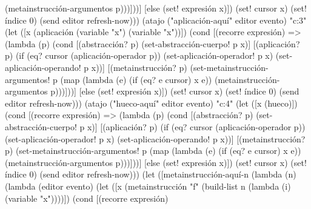 \documentclass[10pt,oneside,openany,letterpaper]{book}
\begin{document}
                                        (metainstrucción-argumentos p)))]))]
                     [else
                      (set! expresión x)])
               (set! cursor x)
               (set! índice 0)
               (send editor refresh-now)))
      (atajo ("aplicación-aquí" editor evento) "c:3"
             (let ([x (aplicación (variable "x") (variable "x"))])
               (cond [(recorre expresión)
                      => (lambda (p)
                           (cond [(abstracción? p)
                                  (set-abstracción-cuerpo! p x)]
                                 [(aplicación? p)
                                  (if (eq? cursor (aplicación-operador p))
                                      (set-aplicación-operador! p x)
                                      (set-aplicación-operando! p x))]
                                 [(metainstrucción? p)
                                  (set-metainstrucción-argumentos! p
                                   (map (lambda (e)
                                          (if (eq? e cursor) x e))
                                        (metainstrucción-argumentos p)))]))]
                     [else
                      (set! expresión x)])
               (set! cursor x)
               (set! índice 0)
               (send editor refresh-now)))
      (atajo ("hueco-aquí" editor evento) "c:4"
             (let ([x (hueco)])
               (cond [(recorre expresión)
                      => (lambda (p)
                           (cond [(abstracción? p)
                                  (set-abstracción-cuerpo! p x)]
                                 [(aplicación? p)
                                  (if (eq? cursor (aplicación-operador p))
                                      (set-aplicación-operador! p x)
                                      (set-aplicación-operando! p x))]
                                 [(metainstrucción? p)
                                  (set-metainstrucción-argumentos! p
                                   (map (lambda (e)
                                          (if (eq? e cursor) x e))
                                        (metainstrucción-argumentos p)))]))]
                     [else
                      (set! expresión x)])
               (set! cursor x)
               (set! índice 0)
               (send editor refresh-now)))
      (let ([metainstrucción-aquí-n
             (lambda (n)
               (lambda (editor evento)
                 (let ([x (metainstrucción "f" (build-list n (lambda (i) (variable "x"))))])
                   (cond [(recorre expresión)
\end{document}
